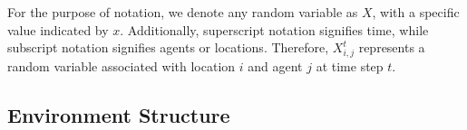 \documentclass[letterpaper, 10 pt, conference]{IEEEConference}
\begin{document}
For the purpose of notation, we denote any random variable as $X$, with a specific value indicated by $x$. Additionally, superscript notation signifies time, while subscript notation signifies agents or locations. Therefore, $X_{i,j}^t$ represents a random variable associated with location $i$ and agent $j$ at time step $t$.








\subsection{Environment Structure}
\end{document}
